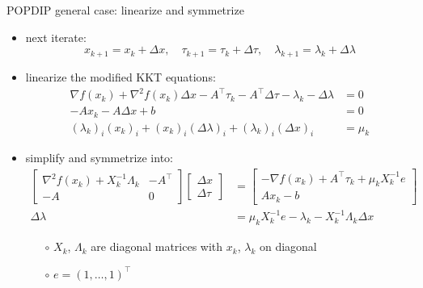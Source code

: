 \documentclass[10pt,hyperref,dvipsnames]{beamer}
\newcommand{\grad}{\nabla}
\begin{document}
\begin{frame}{POPDIP general case: linearize and symmetrize}

\begin{itemize}
\item next iterate:
    $$x_{k+1} = x_k + \Delta x, \quad \tau_{k+1} = \tau_k + \Delta \tau, \quad \lambda_{k+1} = \lambda_k + \Delta \lambda$$
\item linearize the modified KKT equations:
\begin{align*}
\grad f(x_k) + \grad^2 f(x_k) \Delta x - A^\top \tau_k - A^\top \Delta \tau - \lambda_k - \Delta \lambda &= 0 \\
-A x_k - A \Delta x + b &= 0 \\
(\lambda_k)_i (x_k)_i + (x_k)_i (\Delta\lambda)_i + (\lambda_k)_i (\Delta x)_i &= \mu_k
\end{align*}
\item simplify and symmetrize into:
\begin{align*}
\begin{bmatrix}
\grad^2 f(x_k) + X_k^{-1}\Lambda_k & -A^\top \\
-A             & 0
\end{bmatrix}
\begin{bmatrix}
\Delta x \\
\Delta \tau
\end{bmatrix}
&=
\begin{bmatrix}
-\grad f(x_k) + A^\top \tau_k + \mu_k X_k^{-1} e \\
A x_k - b
\end{bmatrix} \\
\Delta\lambda &= \mu_k X_k^{-1} e - \lambda_k - X_k^{-1} \Lambda_k \Delta x
\end{align*}

    \begin{itemize}
    \item[$\circ$] $X_k$, $\Lambda_k$ are diagonal matrices with $x_k$, $\lambda_k$ on diagonal
    \item[$\circ$] $e=(1,\dots,1)^\top$
    \end{itemize}
\end{itemize}
\end{frame}
\end{document}
